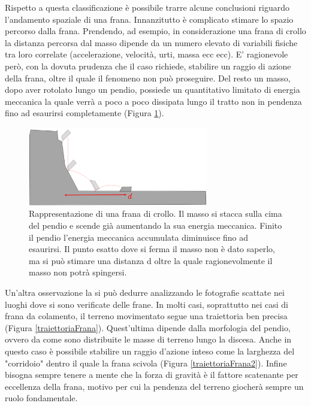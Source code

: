 Rispetto a questa classificazione è possibile trarre alcune conclusioni riguardo l'andamento spaziale di una frana.  Innanzitutto è complicato stimare lo spazio percorso dalla frana. Prendendo, ad esempio, in considerazione una frana di crollo la distanza percorsa dal masso dipende da un numero elevato di variabili fisiche tra loro correlate (accelerazione, velocità, urti, massa ecc ecc). E' ragionevole però, con la dovuta prudenza che il caso richiede, stabilire un raggio di azione della frana, oltre il quale il fenomeno non può proseguire. Del resto un masso, dopo aver rotolato lungo un pendio, possiede un quantitativo limitato di energia meccanica la quale verrà a poco a poco dissipata lungo il tratto non in pendenza fino ad esaurirsi completamente (Figura \ref{distanzaFrana}). 

\begin{figure}[h]
	\centering
	\includegraphics[width=0.7\textwidth]{images/distanza_frana}
	\caption{Rappresentazione di una frana di crollo. Il masso si stacca sulla cima del pendio e scende già aumentando la sua energia meccanica. Finito il pendio l'energia meccanica accumulata diminuisce fino ad esaurirsi. Il punto esatto dove si ferma il masso non è dato saperlo, ma si può stimare una distanza d oltre la quale ragionevolmente il masso non potrà spingersi.}
	\label{distanzaFrana}
\end{figure}

Un'altra osservazione la si può dedurre analizzando le fotografie scattate nei luoghi dove si sono verificate delle frane. In molti casi, soprattutto nei casi di frana da colamento, il terreno movimentato segue una traiettoria ben precisa (Figura \ref{traiettoriaFrana}). Quest'ultima dipende dalla morfologia del pendio, ovvero da come sono distribuite le masse di terreno lungo la discesa. Anche in questo caso è possibile stabilire un raggio d'azione inteso come la larghezza del "corridoio" dentro il quale la frana scivola (Figura \ref{traiettoriaFrana2}). Infine bisogna sempre tenere a mente che la forza di gravità è il fattore scatenante per eccellenza della frana, motivo per cui la pendenza del terreno giocherà sempre un ruolo fondamentale.

